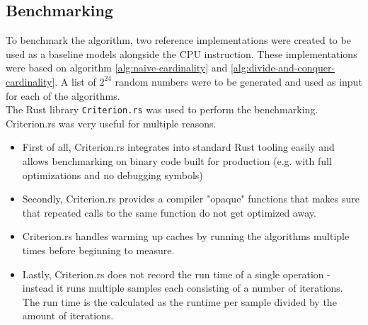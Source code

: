 \subsection{Benchmarking}
To benchmark the algorithm, two reference implementations were created to be used as a baseline models alongside the CPU instruction. These implementations were based on algorithm \ref{alg:naive-cardinality} and \ref{alg:divide-and-conquer-cardinality}. A list of $2^{24}$ random numbers were to be generated and used as input for each of the algorithms.\\
The Rust library \texttt{Criterion.rs}\cite{criterion} was used to perform the benchmarking. Criterion.rs was very useful for multiple reasons. 
\begin{itemize}
    \item First of all, Criterion.rs integrates into standard Rust tooling easily and allows benchmarking on binary code built for production (e.g. with full optimizations and no debugging symbols)
    \item Secondly, Criterion.rs provides a compiler "opaque" functions that makes sure that repeated calls to the same function do not get optimized away.
    \item Criterion.rs handles warming up caches by running the algorithms multiple times before beginning to measure.
    \item Lastly, Criterion.rs does not record the run time of a single operation - instead it runs multiple samples each consisting of a number of iterations. The run time is the calculated as the runtime per sample divided by the amount of iterations. 
\end{itemize}
